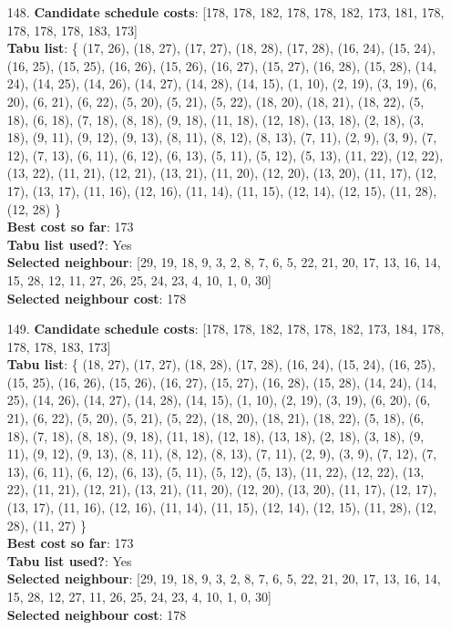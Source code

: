 \documentclass[fleqn]{article}
\begin{document}
\begin{itemize}
    \item[148.] \textbf{Candidate schedule costs}: [178, 178, 182, 178, 178, 182, 173, 181, 178, 178, 178, 178, 183, 173] \\
    \textbf{Tabu list}: \{ (17, 26), (18, 27), (17, 27), (18, 28), (17, 28), (16, 24), (15, 24), (16, 25), (15, 25), (16, 26), (15, 26), (16, 27), (15, 27), (16, 28), (15, 28), (14, 24), (14, 25), (14, 26), (14, 27), (14, 28), (14, 15), (1, 10), (2, 19), (3, 19), (6, 20), (6, 21), (6, 22), (5, 20), (5, 21), (5, 22), (18, 20), (18, 21), (18, 22), (5, 18), (6, 18), (7, 18), (8, 18), (9, 18), (11, 18), (12, 18), (13, 18), (2, 18), (3, 18), (9, 11), (9, 12), (9, 13), (8, 11), (8, 12), (8, 13), (7, 11), (2, 9), (3, 9), (7, 12), (7, 13), (6, 11), (6, 12), (6, 13), (5, 11), (5, 12), (5, 13), (11, 22), (12, 22), (13, 22), (11, 21), (12, 21), (13, 21), (11, 20), (12, 20), (13, 20), (11, 17), (12, 17), (13, 17), (11, 16), (12, 16), (11, 14), (11, 15), (12, 14), (12, 15), (11, 28), (12, 28) \} \\
    \textbf{Best cost so far}: 173 \\
    \textbf{Tabu list used?}: Yes \\
    \textbf{Selected neighbour}: [29, 19, 18, 9, 3, 2, 8, 7, 6, 5, 22, 21, 20, 17, 13, 16, 14, 15, 28, 12, 11, 27, 26, 25, 24, 23, 4, 10, 1, 0, 30] \\
    \textbf{Selected neighbour cost}: 178
      

    \item[149.] \textbf{Candidate schedule costs}: [178, 178, 182, 178, 178, 182, 173, 184, 178, 178, 178, 183, 173] \\
    \textbf{Tabu list}: \{ (18, 27), (17, 27), (18, 28), (17, 28), (16, 24), (15, 24), (16, 25), (15, 25), (16, 26), (15, 26), (16, 27), (15, 27), (16, 28), (15, 28), (14, 24), (14, 25), (14, 26), (14, 27), (14, 28), (14, 15), (1, 10), (2, 19), (3, 19), (6, 20), (6, 21), (6, 22), (5, 20), (5, 21), (5, 22), (18, 20), (18, 21), (18, 22), (5, 18), (6, 18), (7, 18), (8, 18), (9, 18), (11, 18), (12, 18), (13, 18), (2, 18), (3, 18), (9, 11), (9, 12), (9, 13), (8, 11), (8, 12), (8, 13), (7, 11), (2, 9), (3, 9), (7, 12), (7, 13), (6, 11), (6, 12), (6, 13), (5, 11), (5, 12), (5, 13), (11, 22), (12, 22), (13, 22), (11, 21), (12, 21), (13, 21), (11, 20), (12, 20), (13, 20), (11, 17), (12, 17), (13, 17), (11, 16), (12, 16), (11, 14), (11, 15), (12, 14), (12, 15), (11, 28), (12, 28), (11, 27) \} \\
    \textbf{Best cost so far}: 173 \\
    \textbf{Tabu list used?}: Yes \\
    \textbf{Selected neighbour}: [29, 19, 18, 9, 3, 2, 8, 7, 6, 5, 22, 21, 20, 17, 13, 16, 14, 15, 28, 12, 27, 11, 26, 25, 24, 23, 4, 10, 1, 0, 30] \\
    \textbf{Selected neighbour cost}: 178
      


\end{itemize}
\end{document}
